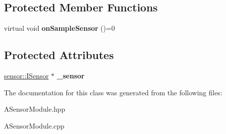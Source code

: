 \subsection*{Protected Member Functions}
\begin{DoxyCompactItemize}
\item 
\mbox{\label{classwood_box_1_1module_1_1_a_sensor_module_a8d32e6ff10ea54a75676786ca21bbefe}} 
virtual void {\bfseries on\+Sample\+Sensor} ()=0
\end{DoxyCompactItemize}
\subsection*{Protected Attributes}
\begin{DoxyCompactItemize}
\item 
\mbox{\label{classwood_box_1_1module_1_1_a_sensor_module_adb99e18121febd3fe7edb084c3cad3f2}} 
\mbox{\hyperlink{classwood_box_1_1sensor_1_1_i_sensor}{sensor\+::\+I\+Sensor}} $\ast$ {\bfseries \+\_\+sensor}
\end{DoxyCompactItemize}


The documentation for this class was generated from the following files\+:\begin{DoxyCompactItemize}
\item 
A\+Sensor\+Module.\+hpp\item 
A\+Sensor\+Module.\+cpp\end{DoxyCompactItemize}
